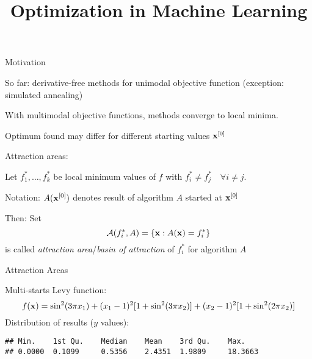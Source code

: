 \documentclass[11pt,compress,t,notes=noshow, xcolor=table]{beamer}
\title{Optimization in Machine Learning}
\begin{document}

\begin{framei}{Motivation}
\item So far: derivative-free methods for unimodal objective function (exception: simulated annealing)
\item With multimodal objective functions, methods converge to local minima.
\item Optimum found may differ for different starting values $\mathbf{x}^{[0]}$
\item Attraction areas:
\item Let $f_1^*, \ldots, f_k^*$ be local minimum values of $f$ with $f_i^* \neq f_j^* \quad \forall i \neq j$.
\item Notation: $A(\mathbf{x}^{[0]})$ denotes result of algorithm $A$ started at $\mathbf{x}^{[0]}$
\item Then: Set
$$\mathcal{A}(f_i^*, A) = \left\{ \mathbf{x} : A(\mathbf{x}) = f_i^*\right\}$$
is called \textit{attraction area}/\textit{basin of attraction} of $f_i^*$ for algorithm $A$
\end{framei}

\begin{frame2}{Attraction Areas}
\end{frame2}

\begin{vbframe}{Multi-starts}
Levy function:
$$f(\mathbf{x}) = \sin^2(3\pi x_1) + (x_1 - 1)^2 [1 + \sin^2(3\pi x_2)] + (x_2 -1)^2[1 + \sin^2(2\pi x_2)]$$
Distribution of results ($y$ values):
\begin{verbatim}
## Min.    1st Qu.    Median    Mean    3rd Qu.    Max.
## 0.0000  0.1099     0.5356    2.4351  1.9809     18.3663
\end{verbatim}
\end{vbframe}
\end{document}
